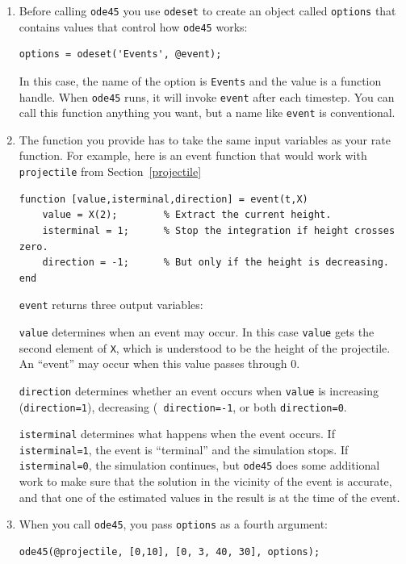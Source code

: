 \documentclass{book}
\begin{document}
\begin{enumerate}

\item Before calling {\tt ode45} you use {\tt odeset} to create an
object called {\tt options} that contains values that control
how {\tt ode45} works:

\begin{verbatim}
options = odeset('Events', @event);
\end{verbatim}
%
In this case, the name of the option is {\tt Events} and the
value is a function handle.  When {\tt ode45} runs, it will invoke
{\tt event} after each timestep.
You can call this function anything you want, but a name
like {\tt event} is conventional.

\item The function you provide has to take
the same input variables as your rate function.  For example,
here is an event function that would work with {\tt projectile}
from Section~\ref{projectile}

\begin{verbatim}
function [value,isterminal,direction] = event(t,X)
    value = X(2);        % Extract the current height.
    isterminal = 1;      % Stop the integration if height crosses zero.
    direction = -1;      % But only if the height is decreasing.
end
\end{verbatim}

{\tt event} returns three output variables:

{\tt value} determines
when an event may occur.  In this case {\tt value} gets the second
element of {\tt X}, which is understood to be the height of the
projectile.  An ``event'' may occur when this value passes
through 0.

{\tt direction} determines whether an event occurs when
{\tt value} is increasing ({\tt direction=1}), decreasing ({\tt
direction=-1}, or both {\tt direction=0}.

{\tt isterminal} determines what happens when the event
occurs.  If {\tt isterminal=1}, the event is ``terminal'' and the
simulation stops.  If {\tt isterminal=0}, the simulation continues,
but {\tt ode45} does some additional work to make sure that the
solution in the vicinity of the event is accurate, and that one of the
estimated values in the result is at the time of the event.

\item When you call {\tt ode45}, you pass {\tt options} as a fourth
argument:

\begin{verbatim}
ode45(@projectile, [0,10], [0, 3, 40, 30], options);
\end{verbatim}
%
\end{enumerate}
\end{document}
